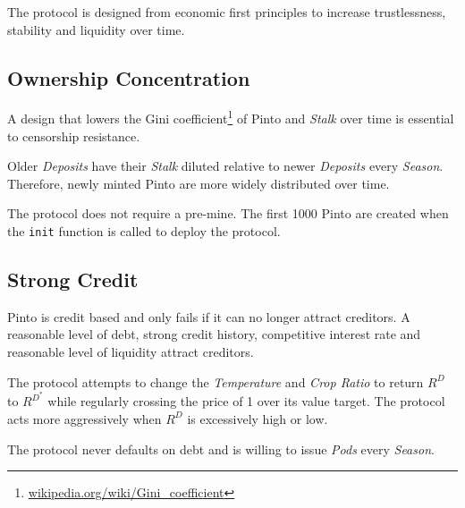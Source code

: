\documentclass[tikz]{article}
\newcommand{\code}[1]{\texttt{#1}}
\newcommand{\term}[1]{\textsl{#1}}
\newcommand{\fref}[1]{\footnote{\href{http://#1}{#1}}}
\newcommand{\Pinto}{} %
\begin{document}
The protocol is designed from economic first principles to increase trustlessness, stability and liquidity over time.


\vspace{0.1cm}
\subsection{Ownership Concentration}
\vspace{0.1cm}

A design that lowers the Gini coefficient\fref{wikipedia.org/wiki/Gini\_coefficient} of Pinto and \term{Stalk} over time is essential to censorship resistance.

\vspace{0.1cm}

Older \term{Deposits} have their \term{Stalk} diluted relative to newer \term{Deposits} every \term{Season}. Therefore, newly minted Pinto are more widely distributed over time.

\vspace{0.1cm}

The protocol does not require a pre-mine. The first 1000 Pinto are created when the \code{init} function is called to deploy the protocol.


\vspace{0.1cm}
\subsection{Strong Credit}
\vspace{0.1cm}

Pinto is credit based and only fails if it can no longer attract creditors. A reasonable level of debt, strong credit history, competitive interest rate and reasonable level of liquidity attract creditors. 

\vspace{0.1cm}

The protocol attempts to change the \term{Temperature} and \term{Crop Ratio} to return $R^{D}$ to $R^{D^{*}}$ while regularly crossing the price of \Pinto1 over its value target. The protocol acts more aggressively when $R^{D}$ is excessively high or low.

\vspace{0.1cm}

The protocol never defaults on debt and is willing to issue \term{Pods} every \term{Season}. 
\end{document}
